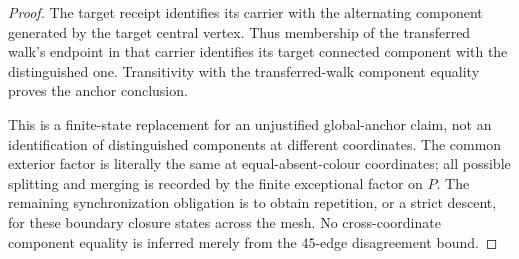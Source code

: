 \begin{proof}
The target receipt identifies its carrier with the alternating component
generated by the target central vertex.  Thus membership of the transferred
walk's endpoint in that carrier identifies its target connected component
with the distinguished one.  Transitivity with the transferred-walk
component equality proves the anchor conclusion.

This is a finite-state replacement for an unjustified global-anchor claim,
not an identification of distinguished components at different coordinates.
The common exterior factor is literally the same at equal-absent-colour
coordinates; all possible splitting and merging is recorded by the finite
exceptional factor on $P$.  The remaining synchronization obligation is to
obtain repetition, or a strict descent, for these boundary closure states
across the mesh.  No cross-coordinate component equality is inferred merely
from the $45$-edge disagreement bound.
\end{proof}

